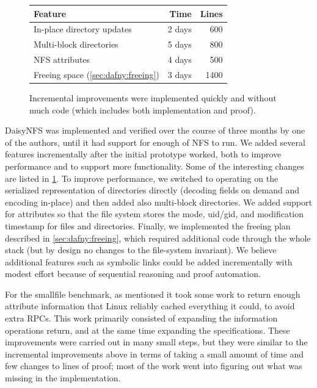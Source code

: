 \begin{figure}
\begin{center}
\begin{tabular}{lrr}
  \toprule
  \textbf{Feature} & \textbf{Time} & \textbf{Lines} \\
  \midrule
  In-place directory updates & 2 days & 600\\
  Multi-block directories & 5 days & 800 \\
  NFS attributes & 4 days & 500 \\
  Freeing space (\cref{sec:dafny:freeing}) & 3 days & 1400\\
  \bottomrule
\end{tabular}
\end{center}
\caption{Incremental improvements were implemented quickly and without much
  code (which includes both implementation and proof).}
\label{fig:features}
\end{figure}

DaisyNFS was implemented and verified over the course of three months by
one of the authors, until it had support for enough of NFS to run. We
added several features incrementally after the initial prototype
worked, both to improve performance and to support more
functionality. Some of the interesting changes are listed in
\cref{fig:features}.  To improve performance, we switched to
operating on the serialized representation of directories directly
(decoding fields on demand and encoding in-place) and then added also
multi-block directories.  We added support for attributes so that the file
system stores the mode, uid/gid, and modification timestamp for files and directories.
Finally, we implemented the freeing plan described
in \cref{sec:dafny:freeing}, which required additional code through the
whole stack (but by design no changes to the file-system invariant).
We believe additional features such as symbolic links
could be added incrementally with modest effort because
of sequential reasoning and proof automation.

For the smallfile benchmark, as mentioned it took some work to return enough
attribute information that Linux reliably cached everything it could, to avoid
extra RPCs. This work primarily consisted of expanding the information
operations return, and at the same time expanding the specifications. These
improvements were carried out in many small steps, but they were similar to the
incremental improvements above in terms of taking a small amount of time and
few changes to lines of proof; most of the work went into figuring out what was
missing in the implementation.

